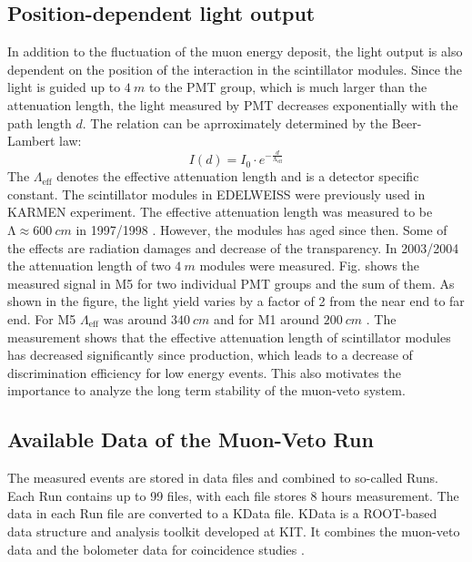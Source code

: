 \subsection{Position-dependent light output}
In addition to the fluctuation of the muon energy deposit, the light output is also dependent on the position of the interaction in the scintillator modules. Since the light is guided up to $\SI{4}{m}$ to the PMT group, which is much larger than the attenuation length, the light measured by PMT decreases exponentially with the path length $d$. The relation can be aprroximately determined by the Beer-Lambert law:
\begin{equation}
  I(d)=I_{0}\cdot e^{-\frac{d}{\mathrm{\Lambda}_{\mathrm{eff}}}}
\end{equation}
The $\Lambda_{\mathrm{eff}}$ denotes the effective attenuation length and is a detector specific constant.
The scintillator modules in EDELWEISS were previously used in KARMEN experiment. The effective attenuation length was measured to be $\mathrm{\Lambda} \approx \SI{600}{cm}$ in 1997/1998 \cite{Rei98}. However, the modules has aged since then. Some of the effects are radiation damages and decrease of the transparency.
In 2003/2004 the attenuation length of two $\SI{4}{m}$ modules were measured. Fig. shows the measured signal in M5 for two individual PMT groups and the sum of them. As shown in the figure, the light yield varies by a factor of 2 from the near end to far end.
For M5 $\Lambda_{\mathrm{eff}}$ was around $\SI{340}{cm}$ and for M1 around $\SI{200}{cm}$ \cite{Hab04}. The measurement shows that the effective attenuation length of scintillator modules has decreased significantly since production, which leads to a decrease of discrimination efficiency for low energy events. This also motivates the importance to analyze the long term stability of the muon-veto system.


\subsection{Available Data of the Muon-Veto Run}

The measured events are stored in data files and combined to so-called Runs. Each Run contains up to 99 files, with each file stores 8 hours measurement. The data in each Run file are converted to a KData file. KData is a ROOT-based \cite{Bru97} data structure and analysis toolkit developed at KIT. It combines the muon-veto data and the bolometer data for coincidence studies \cite{Cox12}.

